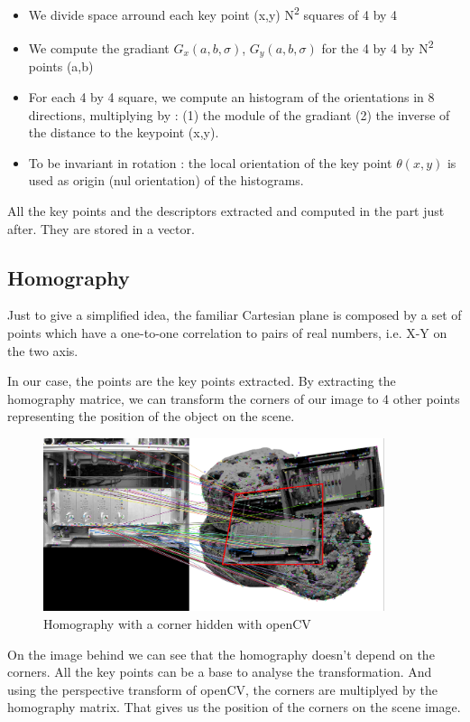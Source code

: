 \documentclass[english,a4paper,11pt]{report}
\newcommand{\ts}{\textsuperscript}
\begin{document}
	\begin{itemize}
			\item We divide space arround each key point (x,y) N\ts{2} squares of 4 by 4
		\item We compute the gradiant \begin{math}G_{x}(a,b,\sigma)\end{math}, \begin{math}G_{y}(a,b,\sigma)\end{math} for the 4 by 4 by N\ts{2} points (a,b)

		\item For each 4 by 4 square, we compute an histogram of the orientations in 8 directions, multiplying by : (1) the module of the gradiant (2) the inverse of the distance to the keypoint (x,y).
		\item  To be invariant in rotation : the local orientation of the key point \begin{math} \theta(x,y) \end{math} is used as origin (nul orientation) of the histograms.		
	\end{itemize}

	\par All the key points and the descriptors extracted and computed in the  part just after. They are stored in a vector.
	
	
	\subsection{Homography}
	\par  Just to give a simplified idea, the familiar Cartesian plane is composed by a set of points which have a one-to-one correlation to pairs of real numbers, i.e. X-Y on the two axis.\cite{Homography}
	\par In our case, the points are the key points extracted. By extracting the homography matrice, we can transform the corners of our image to 4 other points representing the position of the object on the scene\cite{TutoHomography}.
	
	\begin{figure}
			\includegraphics[width=10cm]{images_not_compressed/showHomography.png}
			\caption{Homography with a corner hidden with openCV}
	\end{figure}
	\par On the image behind we can see that the homography doesn't depend on the corners. All the key points can be a base to analyse the transformation. And using the perspective transform of openCV, the corners are multiplyed by the homography matrix. That gives us the position of the corners on the scene image.
	
\end{document}
